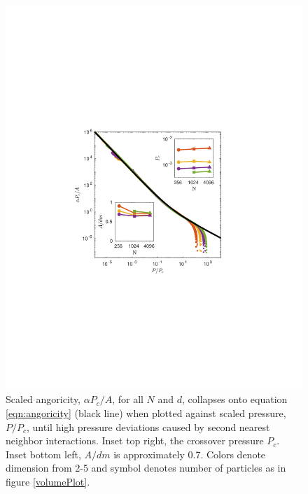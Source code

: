 \begin{figure}[h!]
\centering
\includegraphics[width=\columnwidth, trim=143 240 165 253, clip]{forceVolumeEntropyPaper/angoricityInset.pdf}
\caption{Scaled angoricity, $\alpha P_c/A$, for all $N$ and $d$, collapses onto equation \ref{eqn:angoricity} (black line) when plotted against scaled pressure, $P/P_c$, until high pressure deviations caused by second nearest neighbor interactions. Inset top right, the crossover pressure $P_c$. Inset bottom left, $A/dm$ is approximately 0.7. Colors denote dimension from 2-5 and symbol denotes number of particles as in figure \ref{volumePlot}.
}
\label{angoricityPlot}
\end{figure}

